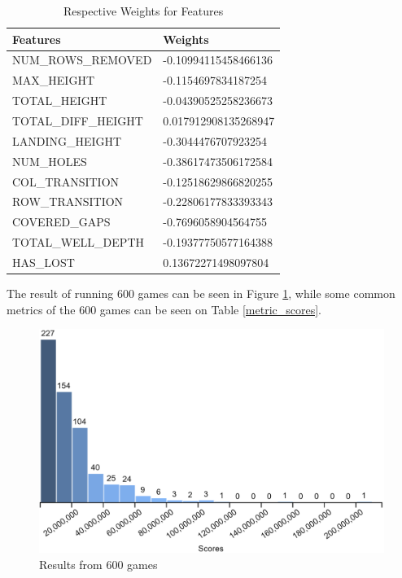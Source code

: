 \documentclass[a4paper,12pt,twocolumn]{article}
\begin{document}
\begin{table}[h]
    \begin{tabular}{|l|l|}
        \hline
        \textbf{Features}   & \textbf{Weights}     \\
        \hline
        NUM\_ROWS\_REMOVED  & -0.10994115458466136 \\
        \hline
        MAX\_HEIGHT         & -0.1154697834187254  \\
        \hline
        TOTAL\_HEIGHT       & -0.04390525258236673 \\
        \hline
        TOTAL\_DIFF\_HEIGHT & 0.017912908135268947 \\
        \hline
        LANDING\_HEIGHT     & -0.3044476707923254  \\
        \hline
        NUM\_HOLES          & -0.38617473506172584 \\
        \hline
        COL\_TRANSITION     & -0.12518629866820255 \\
        \hline
        ROW\_TRANSITION     & -0.22806177833393343 \\
        \hline
        COVERED\_GAPS       & -0.7696058904564755  \\
        \hline
        TOTAL\_WELL\_DEPTH  & -0.19377750577164388 \\
        \hline
        HAS\_LOST           & 0.13672271498097804  \\
        \hline
    \end{tabular}
    \caption{Respective Weights for Features}
    \label{feature_weights}
\end{table}

The result of running 600 games can be seen in Figure \ref{score_histogram},
while some common metrics of the 600 games can be seen on Table \ref{metric_scores}.\\

\begin{figure}[h]
    \centering
    \includegraphics[scale=0.15]{games_600_histogram.png}
    \caption{Results from 600 games}
    \label{score_histogram}
\end{figure}
\end{document}
